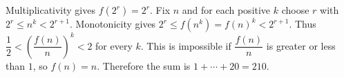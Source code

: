 Multiplicativity gives $f(2^r)=2^r$. Fix $n$ and for each positive $k$ choose $r$ with $2^r\le n^k<2^{r+1}$. Monotonicity gives $2^r\le f(n^k)=f(n)^k<2^{r+1}$. Thus $\dfrac{1}{2} < (\dfrac{f (n)}{n})^k < 2$ for every $k$. This is impossible if $\dfrac{f (n)}{n}$ is greater or less than $1$, so $f(n)=n$. Therefore the sum is $1+\cdots+20=\boxed{210}$.
